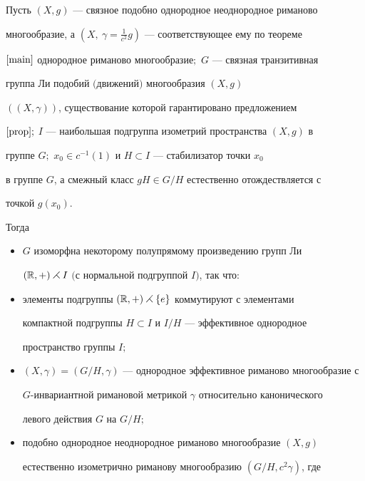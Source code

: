 \begin{thms}


\label{riem}


Пусть $(X,g)$ --- связное подобно однородное неоднородное риманово


многообразие, а $(X,\ \gamma=\frac{1}{c^{2}}g)$ --- соответствующее ему по теореме


$\ref{main}$ однородное риманово многообразие\/$;$ $G$ --- связная транзитивная


группа Ли подобий $($движений$)$ многообразия $(X,g)$


$((X,\gamma))$, существование которой гарантировано предложением


$\ref{prop};$ $I$ --- наибольшая подгруппа изометрий пространства $(X,g)$ в


группе $G;$ $x_{0}\in c^{-1}(1)$ и $H \subset I$ --- стабилизатор точки $x_{0}$


в группе $G$, а смежный класс $gH \in G/H$ естественно отождествляется с


точкой $g(x_{0})$.





Тогда


\begin{itemize}


\item[1)] $G$ изоморфна некоторому полупрямому произведению групп Ли


$(\Bbb{R},+)\rightthreetimes I$ $($с нормальной подгруппой $I)$, так что\/${:}$


\item[2)] элементы подгруппы $(\Bbb{R},+)\rightthreetimes


\{e\}$ коммутируют с элементами


компактной подгруппы $H \subset I$ и $I/H$ --- эффективное однородное


пространство группы $I;$


\item[3)] $(X,\gamma)=(G/H,\gamma)$ --- однородное эффективное риманово многообразие с


$G$-инвариантной римановой метрикой $\gamma$ относительно канонического


левого действия $G$ на $G/H;$


\item[4)] подобно однородное неоднородное риманово многообразие $(X,g)$


естественно изометрично риманову многообразию $(G/H,c^{2}\gamma)$, где



\end{itemize}
\end{thms}

